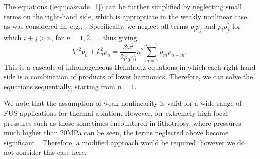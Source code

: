 \documentclass[preprint]{JASA}
\newcommand{\red}[1]{{\color{red} #1}}
\begin{document}
The equations (\ref{eqn:cascade_1}) can be further simplified by neglecting 
small terms on the right-hand side, which is appropriate in the weakly nonlinear
case, as was considered in, e.g., \cite{du2013fast}. Specifically, we neglect all terms $p_ip_j$
and $p_ip^*_j$ for which $i+j>n$, for $n=1,2,\ldots$, thus giving
\begin{equation}
    \nabla^2 p_n
    + k_n^2 p_n = \frac{\beta\omega^2}{2\rho_0 c_0^4}n^2
    \sum_{m=1}^{n-1}p_m p_{n-m}.
    \label{eqn:cascade_2}
\end{equation}
This is a cascade of inhomogeneous Helmholtz equations in which each right-hand 
side is a combination of products of lower harmonics. Therefore, we can solve 
the equations sequentially, starting from $n=1$.

We note that the assumption of weak nonlinearity is valid for a wide range of \red{FUS} applications for thermal ablation. However, for extremely high focal pressures 
such as those sometimes encountered in lithotripsy, where pressures much higher 
than 20MPa can be seen, the terms neglected above become significant~\cite{izadifar2017mechanical}. 
Therefore, a modified approach would be required, however we do not consider 
this case here.

\end{document}
